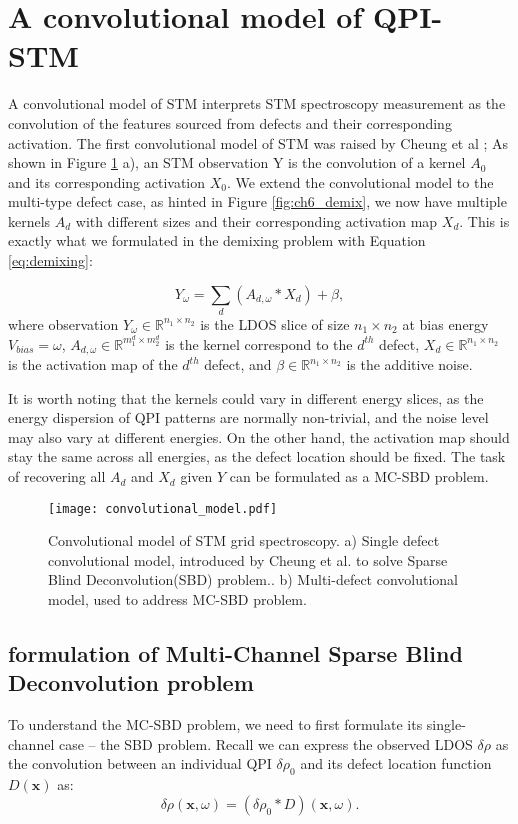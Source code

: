 \section{A convolutional model of QPI-STM}
A convolutional model of STM interprets STM spectroscopy measurement as the convolution of the features sourced from defects and their corresponding activation. The first convolutional model of STM was raised by Cheung et al \cite{cheungDictionaryLearningFouriertransform2020}; As shown in Figure \ref{fig:ch6_conv} a), an STM observation Y is the convolution of a kernel $A_0$ and its corresponding activation $X_0$. We extend the convolutional model to the multi-type defect case, as hinted in Figure \ref{fig:ch6_demix}, we now have multiple kernels $A_d$ with different sizes and their corresponding activation map $X_d$. This is exactly what we formulated in the demixing problem with Equation \ref{eq:demixing}:

\begin{equation}
	Y_{\omega} = \sum_d ( A_{d,{\omega}} * X_d) + \beta,
\end{equation}
\noindent where observation $Y_{\omega} \in \mathbb{R}^{n_1 \times n_2}$ is the \ac{LDOS} slice of size $n_1 \times n_2$ at bias energy $V_{bias} = \omega$, $A_{d,{\omega}} \in \mathbb{R}^{m_1^d \times m_2^d}$ is the kernel correspond to the $d^{th}$ defect, $X_{d} \in \mathbb{R}^{n_1 \times n_2}$ is the activation map of the $d^{th}$ defect, and $\beta \in \mathbb{R}^{n_1 \times n_2}$ is the additive noise. 

\noindent It is worth noting that the kernels could vary in different energy slices, as the energy dispersion of QPI patterns are normally non-trivial, and the noise level may also vary at different energies. On the other hand, the activation map should stay the same across all energies, as the defect location should be fixed. The task of recovering all $A_d$ and $X_d$ given $Y$ can be formulated as a \ac{MC-SBD} problem. 
 
\begin{figure}
	\texttt{[image: convolutional\_model.pdf]} 
	\centering
	\caption{Convolutional model of STM grid spectroscopy. a) Single defect convolutional model, introduced by Cheung et al. to solve Sparse Blind Deconvolution(SBD) problem.\cite{cheungDictionaryLearningFouriertransform2020}. b) Multi-defect convolutional model, used to address \ac{MC-SBD} problem.}
	\label{fig:ch6_conv}
\end{figure}


\subsection{formulation of Multi-Channel Sparse Blind Deconvolution problem}
To understand the \ac{MC-SBD} problem, we need to first formulate its single-channel case --  the \ac{SBD} problem. Recall we can express the observed \ac{LDOS} $\delta\rho$ as the convolution between an individual QPI $\delta\rho_0$ and its defect location function $D(\mathbf{x})$ as: 
\begin{equation}
	\delta \rho(\mathbf{x}, \omega) = (\delta \rho_0 *D)(\mathbf{x}, \omega).
\end{equation}

